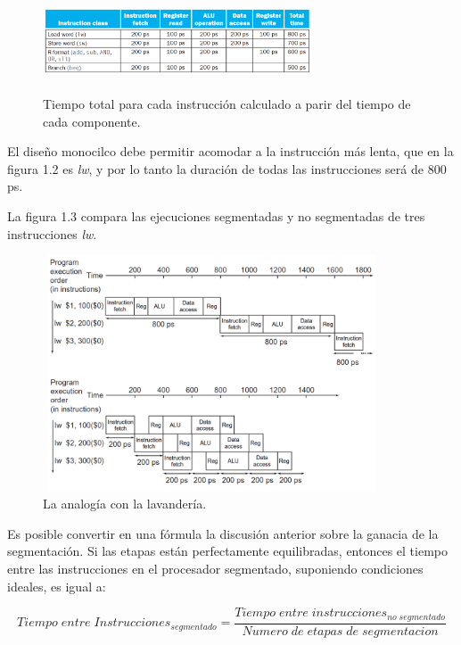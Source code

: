 \documentclass[12pt,a4paper]{report}
\begin{document}
				\begin{figure}[htb]
					\centering
					\includegraphics[width=8cm, height=3cm]{./imagenes/tiempo.png}
					\caption{Tiempo total para cada instrucción calculado a parir del tiempo de cada componente.}
				\end{figure}

			\par El diseño monocilco debe permitir acomodar a la instrucción más lenta, que en la figura 1.2 es \textit{lw}, y por lo tanto la duración de todas las instrucciones será de 800 ps.
			\par La figura 1.3 compara las ejecuciones segmentadas y no segmentadas de tres instrucciones \textit{lw}.

			\begin{figure}[htb]
				\centering
				\includegraphics[width=10cm, height=7cm]{./imagenes/lw.png}
				\caption{La analogía con la lavandería.}
			\end{figure}
			\pagebreak

			\par Es posible convertir en una fórmula la discusión anterior sobre la ganacia de la segmentación. Si las etapas están perfectamente equilibradas, entonces el tiempo entre las instrucciones en el procesador segmentado, suponiendo condiciones ideales, es igual a:

			\[
				Tiempo \; entre \; Instrucciones_{segmentado} = \frac{Tiempo \; entre \; instrucciones_{no \; segmentado}}{Numero \; de \; etapas \; de \; segmentacion}
			\]
\end{document}
